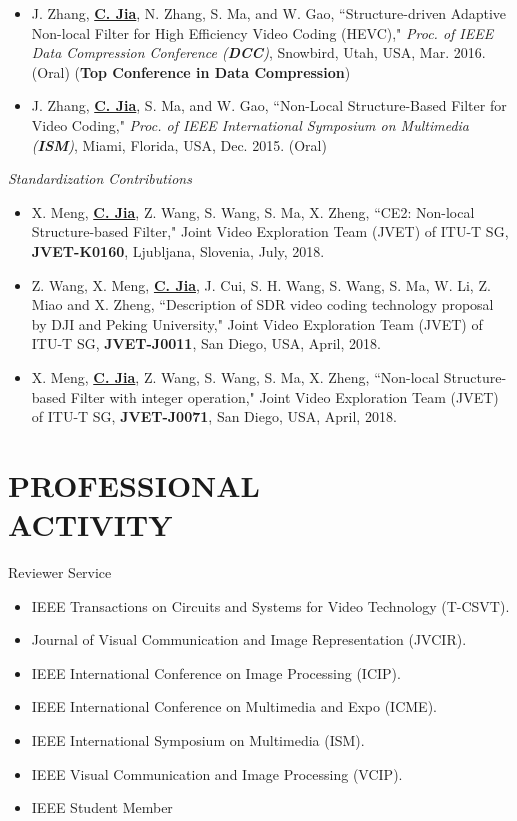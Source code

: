 \documentclass[margin, 10pt]{res} %
\begin{document}
\begin{resume}
\begin{itemize}
\item{J. Zhang, \underline{\bf C. Jia},  N. Zhang, S. Ma, and W. Gao, ``Structure-driven Adaptive Non-local Filter for High Efficiency Video Coding (HEVC)," {\em Proc. of IEEE Data Compression Conference ({\bf DCC})}, Snowbird, Utah, USA, Mar. 2016. (Oral) ({\bf Top Conference in Data Compression})}

\item{J. Zhang, \underline{\bf C. Jia}, S. Ma, and W. Gao, ``Non-Local Structure-Based Filter for Video Coding," {\em Proc. of IEEE International Symposium on Multimedia ({\bf ISM})}, Miami, Florida, USA, Dec. 2015. (Oral)}

\end{itemize}

{\sl Standardization Contributions}
\begin{itemize}
\item{X. Meng, \underline{\bf C. Jia}, Z. Wang, S. Wang, S. Ma, X. Zheng, ``CE2: Non-local Structure-based Filter," Joint Video Exploration Team (JVET) of ITU-T SG, {\bf JVET-K0160}, Ljubljana, Slovenia, July, 2018.}
\item{Z. Wang, X. Meng, \underline{\bf C. Jia}, J. Cui, S. H. Wang, S. Wang, S. Ma, W. Li, Z. Miao and X. Zheng, ``Description of SDR video coding technology proposal by DJI and Peking University," Joint Video Exploration Team (JVET) of ITU-T SG, {\bf JVET-J0011}, San Diego, USA, April, 2018. }
\item{X. Meng, \underline{\bf C. Jia}, Z. Wang, S. Wang, S. Ma, X. Zheng, ``Non-local Structure-based Filter with integer operation," Joint Video Exploration Team (JVET) of ITU-T SG, {\bf JVET-J0071}, San Diego, USA, April, 2018.}

\end{itemize}



\section{PROFESSIONAL \\ ACTIVITY}

Reviewer Service
\begin{itemize} \itemsep -2pt
\item{IEEE Transactions on Circuits and Systems for Video Technology (T-CSVT). }
\item{Journal of Visual Communication and Image Representation (JVCIR). }
\item{IEEE International Conference on Image Processing (ICIP).}
\item{IEEE International Conference on Multimedia and Expo (ICME). }
\item{IEEE International Symposium on Multimedia (ISM). }
\item{IEEE Visual Communication and Image Processing (VCIP). }
\item{IEEE Student Member}
\end{itemize}


\end{resume}
\end{document}
